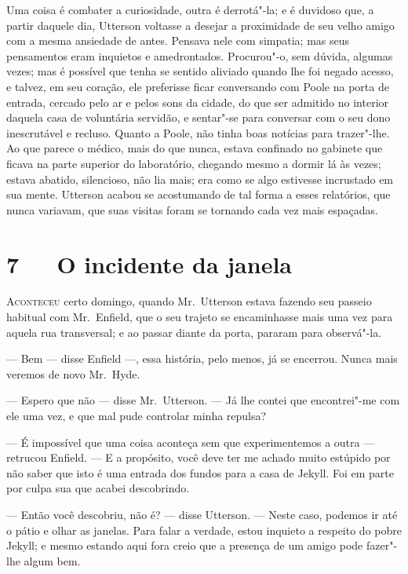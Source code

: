 Uma coisa é combater a curiosidade, outra é derrotá"-la; e é duvidoso
que, a partir daquele dia, Utterson voltasse a desejar a proximidade de
seu velho amigo com a mesma ansiedade de antes.  Pensava nele com
simpatia; mas seus pensamentos eram inquietos e amedrontados. 
Procurou"-o, sem dúvida, algumas vezes; mas é possível que tenha se
sentido aliviado quando lhe foi negado acesso, e talvez, em
seu coração, ele preferisse ficar conversando com Poole na porta de
entrada, cercado pelo ar e pelos sons da cidade, do que ser admitido no
interior daquela casa de voluntária servidão, e sentar"-se para
conversar com o seu dono inescrutável e recluso.  Quanto a Poole, não
tinha boas notícias para trazer"-lhe.  Ao que parece o médico, mais do
que nunca, estava confinado no gabinete que ficava na parte superior do
laboratório, chegando mesmo a dormir lá às vezes; estava abatido,
silencioso, não lia mais; era como se algo estivesse incrustado em
sua mente.  Utterson acabou se acostumando de tal forma a esses
relatórios, que nunca variavam, que suas visitas foram se tornando cada
vez mais espaçadas. 


\chapter[7\ \ \ O incidente da janela]{7\ \ \ O incidente da janela}

\textsc{Aconteceu} certo domingo, quando Mr.~Utterson estava fazendo seu passeio
habitual com Mr.~Enfield, que o seu trajeto se encaminhasse mais uma
vez para aquela rua transversal; e ao passar diante da porta, pararam
para \mbox{observá"-la}.

--- Bem --- disse Enfield ---, essa história, pelo menos, já se encerrou. 
Nunca mais veremos de novo Mr.~Hyde. 

--- Espero que não --- disse Mr.~Utterson. --- Já lhe contei que
encontrei"-me com ele uma vez, e que mal pude controlar minha repulsa?

--- É impossível que uma coisa aconteça sem que experimentemos a outra ---
retrucou Enfield. --- E a propósito, você deve ter me achado muito
estúpido por não saber que isto é uma entrada dos fundos para a casa de
Jekyll.  Foi em parte por culpa sua que acabei descobrindo.

--- Então você descobriu, não é? --- disse Utterson. --- Neste caso, podemos
ir até o pátio e olhar as janelas.  Para falar a verdade, estou
inquieto a respeito do pobre Jekyll; e mesmo estando aqui fora creio
que a presença de um amigo pode fazer"-lhe algum bem.

